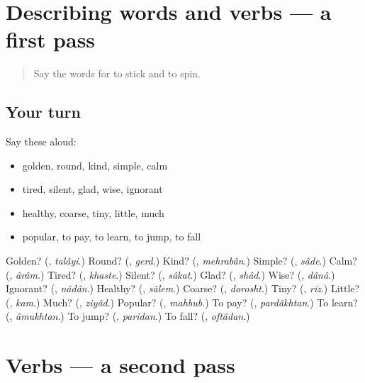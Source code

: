 \section[(dialogue)]{Describing words and verbs — a first pass}

\label{lesson:FA-R135-first-pass-describing-words-and-verbs}



\begin{quote}
Say the words for to stick and to spin.
\end{quote}

\subsection*{Your turn}
Say these aloud:

\begin{itemize}
\raggedright
  \item golden, round, kind, simple, calm
  \item tired, silent, glad, wise, ignorant
  \item healthy, coarse, tiny, little, much
  \item popular, to pay, to learn, to jump, to fall
\end{itemize}

\begin{tcolorbox}[breakable,colback=teal!4,colframe=teal!35!black,title={Before you move on}]
Golden? (\textbf{}, \emph{talâyi}.) Round? (\textbf{}, \emph{gerd}.) Kind? (\textbf{}, \emph{mehrabân}.) Simple? (\textbf{}, \emph{sâde}.) Calm? (\textbf{}, \emph{ârâm}.) Tired? (\textbf{}, \emph{khaste}.) Silent? (\textbf{}, \emph{sâkat}.) Glad? (\textbf{}, \emph{shâd}.) Wise? (\textbf{}, \emph{dânâ}.) Ignorant? (\textbf{}, \emph{nâdân}.) Healthy? (\textbf{}, \emph{sâlem}.) Coarse? (\textbf{}, \emph{dorosht}.) Tiny? (\textbf{}, \emph{riz}.) Little? (\textbf{}, \emph{kam}.) Much? (\textbf{}, \emph{ziyâd}.) Popular? (\textbf{}, \emph{mahbub}.) To pay? (\textbf{}, \emph{pardâkhtan}.) To learn? (\textbf{}, \emph{âmukhtan}.) To jump? (\textbf{}, \emph{paridan}.) To fall? (\textbf{}, \emph{oftâdan}.)
\end{tcolorbox}
\section[(dialogue)]{Verbs — a second pass}

